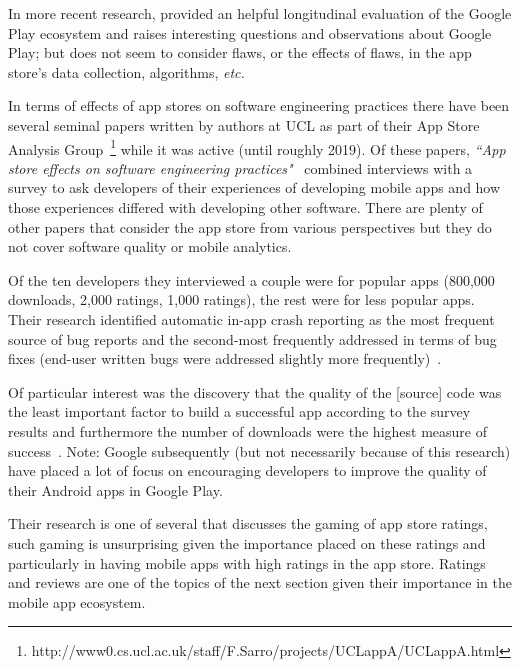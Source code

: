 In more recent research, \textcite{wang2019_understanding_the_evolution_of_mobile_app_ecosystems_a_longitudinal_measurement_of_google_play} provided an helpful longitudinal evaluation of the Google Play ecosystem and raises interesting questions and observations about Google Play; but does not seem to consider flaws, or the effects of flaws, in the app store's data collection, algorithms,\textit{ etc.}

In terms of effects of app stores on software engineering practices there have been several seminal papers written by authors at UCL as part of their App Store Analysis Group~\footnote{http://www0.cs.ucl.ac.uk/staff/F.Sarro/projects/UCLappA/UCLappA.html} while it was active (until roughly 2019). Of these papers, \emph{``App store effects on software engineering practices"}~ combined interviews with a survey to ask developers of their experiences of developing mobile apps and how those experiences differed with developing other software. There are plenty of other papers that consider the app store from various perspectives but they do not cover software quality or mobile analytics.

Of the ten developers they interviewed a couple were for popular apps (800,000 downloads, 2,000 ratings, 1,000 ratings), the rest were for less popular apps. %
Their research identified automatic in-app crash reporting as the most frequent source of bug reports and the second-most frequently addressed in terms of bug fixes (end-user written bugs were addressed slightly more frequently)~\cite[p. 10]{alsubaihin2019app_store_effects_on_software_engineering}. 

Of particular interest was the discovery that the quality of the [source] code was the least important factor to build a successful app according to the survey results and furthermore the number of downloads were the highest measure of success~\cite[p. 13]{alsubaihin2019app_store_effects_on_software_engineering}. Note: Google subsequently (but not necessarily because of this research) have placed a lot of focus on encouraging developers to improve the quality of their Android apps in Google Play. 

Their research is one of several that discusses the gaming of app store ratings, such gaming is unsurprising given the importance placed on these ratings and particularly in having mobile apps with high ratings in the app store. Ratings and reviews are one of the topics of the next section  given their importance in the mobile app ecosystem.

